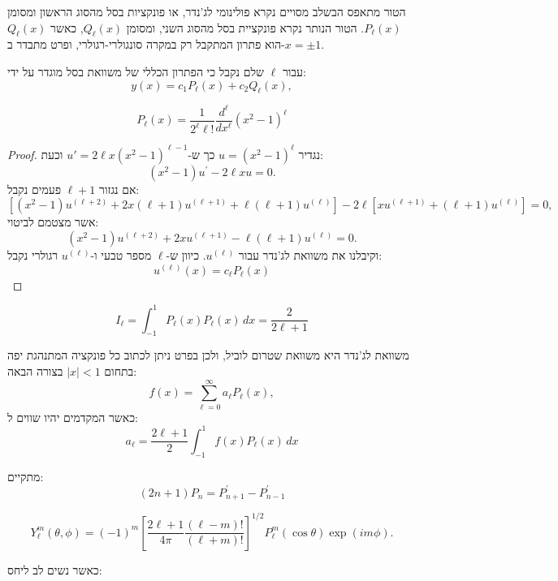 \documentclass{tstextbook}
\begin{document}
\begin{definition}
הטור מתאפס הבשלב מסויים נקרא פולינומי לג'נדר, או פונקציות בסל מהסוג הראשון ומסומן \(P_{\ell}(x)\). הטור הנותר נקרא פונקציית בסל מהסוג השני, ומסומן \(Q_{\ell}(x)\), כאשר \(Q_{\ell}(x)\) הוא פתרון המתקבל רק במקרה סונגולרי-רגולרי, ופרט מתבדר ב-\(x=\pm 1\).

\end{definition}
\begin{corollary}
עבור \(\ell\) שלם נקבל כי הפתרון הכללי של משוואת בסל מוגדר על ידי:
$$y(x)=c_{1}P_{\ell}(x)+c_{2}Q_{\ell}(x),$$

\end{corollary}
\begin{proposition}
$$P_{\ell}(x)=\frac{1}{2^{\ell}\ell!}\frac{d^{\ell}}{d x^{\ell}}(x^{2}-1)^{\ell}$$

\end{proposition}
\begin{proof}
נגדיר \(u=(x^{2}-1)^{\ell}\) כך ש-\(u'=2\ell x(x^{2}-1)^{\ell-1}\) וכעת:
$$(x^{2}-1)u^{\prime}-2\ell x u=0.$$
אם נגזור \(\ell+1\) פעמים נקבל:
$$\left[(x^{2}-1)u^{(\ell+2)}+2x(\ell+1)u^{(\ell+1)}+\ell(\ell+1)u^{(\ell)}\right]-2\ell\left[x u^{(\ell+1)}+(\ell+1)u^{(\ell)}\right]=0,$$
אשר מצטמם לביטוי:
$$(x^{2}-1)u^{(\ell+2)}+2x u^{(\ell+1)}-\ell(\ell+1)u^{(\ell)}=0.$$
וקיבלנו את משוואת לג'נדר עבור \(u^{\left( \ell \right)}\).  כיוון ש-\(\ell\) מספר טבעי ו-\(u^{\left( \ell \right)}\) רגולרי נקבל:
$$u^{(\ell)}(x)=c_{\ell}P_{\ell}(x)$$

\end{proof}
\begin{corollary}
$$I_{\ell}=\int_{-1}^{1}P_{\ell}(x)P_{\ell}(x)\,d x={\frac{2}{2\ell+1}}$$

\end{corollary}
\begin{proposition}
משוואת לג'נדר היא משוואת שטרום לוביל, ולכן בפרט ניתן לכתוב כל פונקציה המתנהגת יפה בתחום \(\lvert x \rvert<1\) בצורה הבאה:
$$f(x)=\sum_{\ell=0}^{\infty}a_{\ell}P_{\ell}(x),$$
כאשר המקדמים יהיו שווים ל:
$$a_{\ell}={\frac{2\ell+1}{2}}\int_{-1}^{1}f(x)P_{\ell}(x)\,d x$$

\end{proposition}
\begin{proposition}
מתקיים:
$$(2n+1)P_{n}=P_{n+1}^{\prime}-P_{n-1}^{\prime}$$

\end{proposition}
\begin{definition}
$$Y_{\ell}^{m}(\theta,\phi)=(-1)^{m}\left[\frac{2\ell+1}{4\pi}\frac{(\ell-m)!}{(\ell+m)!}\right]^{1/2}P_{\ell}^{m}(\cos\theta)\exp(i m\phi).$$

\end{definition}
כאשר נשים לב ליחס:
\end{document}
